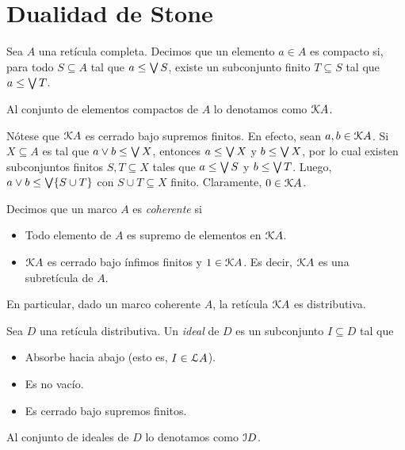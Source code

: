 \section{Dualidad de Stone}

\begin{definition}
    Sea $A$ una retícula completa.
    Decimos que un elemento $a\in A$ es compacto si,
    para todo $S\subseteq A$ tal que $a\leq\Sup S$,
    existe un subconjunto finito $T\subseteq S$ tal que
    $a\leq\Sup T$.
    
    Al conjunto de elementos compactos
    de $A$ lo denotamos como $\cal KA$.
\end{definition}

Nótese que $\cal KA$ es cerrado bajo supremos finitos.
En efecto, sean $a,b\in\cal KA$.
Si $X\subseteq A$ es tal que $a\sup b\leq\Sup X$,
entonces $a\leq\Sup X$ y $b\leq\Sup X$, por lo cual
existen subconjuntos finitos $S,T\subseteq X$
tales que $a\leq\Sup S$ y $b\leq\Sup T$.
Luego, $a\sup b\leq\Sup\{S\cup T\}$ con $S\cup T\subseteq X$ finito.
Claramente, $0\in\cal KA$.

\begin{definition}
    Decimos que un marco $A$ es \emph{coherente} si
    \begin{itemize}
        \item Todo elemento de $A$ es supremo de elementos
        en $\cal KA$.
        \item $\cal KA$ es cerrado bajo ínfimos finitos
        y $1\in\cal KA$.
        Es decir, $\cal KA$ es una subretícula de $A$.
    \end{itemize}
    En particular, dado un marco coherente $A$, la retícula
    $\cal KA$ es distributiva.
\end{definition}

\begin{definition}
    Sea $D$ una retícula distributiva.
    Un \emph{ideal} de $D$ es un subconjunto $I\subseteq D$ tal que
    \begin{itemize}
        \item Absorbe hacia abajo (esto es, $I\in\cal LA$).
        \item Es no vacío.
        \item Es cerrado bajo supremos finitos.
    \end{itemize}
    Al conjunto de ideales de $D$ lo denotamos como $\cal ID$.
\end{definition}

